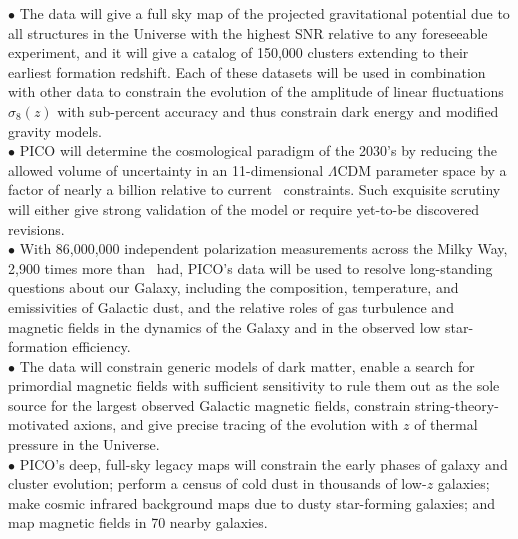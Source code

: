 \documentclass[PICOAPC.tex]{subfiles}
\begin{document}
$\bullet$ The data will give a full sky map of the projected gravitational potential due to all structures in the Universe with the highest \ac{SNR} relative to any foreseeable experiment, and it will give a catalog of 150,000 clusters extending to their earliest formation redshift. Each of these datasets will be used in combination with other data to constrain the evolution of the amplitude of linear fluctuations $\sigma_{8}(z)$ with sub-percent accuracy and thus constrain dark energy and modified gravity models.  \\
$\bullet$ PICO will determine the cosmological paradigm of the 2030's by reducing the allowed volume of uncertainty in an 11-dimensional $ \Lambda$CDM parameter space by a factor of nearly a billion relative to current \planck\ constraints. %
Such exquisite scrutiny will either give strong validation of the model or require yet-to-be discovered revisions. \\
$\bullet$ With 86,000,000 independent polarization measurements across the Milky Way, 2,900 times more than \planck \ had, PICO's data will be used to resolve long-standing questions about our Galaxy, including the 
composition, temperature, and emissivities of Galactic dust, and the relative roles of gas turbulence and magnetic fields in the dynamics of the Galaxy and in the observed low star-formation efficiency. \\
$\bullet$ The data will constrain generic models of dark matter, enable a search for primordial magnetic fields with sufficient sensitivity to rule them out as the sole source for the largest observed Galactic magnetic fields, constrain string-theory-motivated axions, 
and give precise tracing of the evolution with $z$ of thermal pressure in the Universe. \\ 
$\bullet$ PICO's deep, full-sky legacy maps will constrain the early phases of galaxy and cluster evolution;  
perform a census of cold dust in thousands of low-$z$ galaxies; make cosmic infrared background maps 
due to dusty star-forming galaxies; and map magnetic fields in 70 nearby galaxies. 
\end{document}
